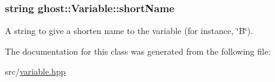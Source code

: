 \subsubsection[{\texorpdfstring{short\+Name}{shortName}}]{\setlength{\rightskip}{0pt plus 5cm}string ghost\+::\+Variable\+::short\+Name\hspace{0.3cm}{\ttfamily [protected]}}\hypertarget{classghost_1_1Variable_afb5eb79a7f6351b4305fe082699b6d7d}{}\label{classghost_1_1Variable_afb5eb79a7f6351b4305fe082699b6d7d}


A string to give a shorten name to the variable (for instance, \char`\"{}\+B\char`\"{}). 



The documentation for this class was generated from the following file\+:\begin{DoxyCompactItemize}
\item 
src/\hyperlink{variable_8hpp}{variable.\+hpp}\end{DoxyCompactItemize}
